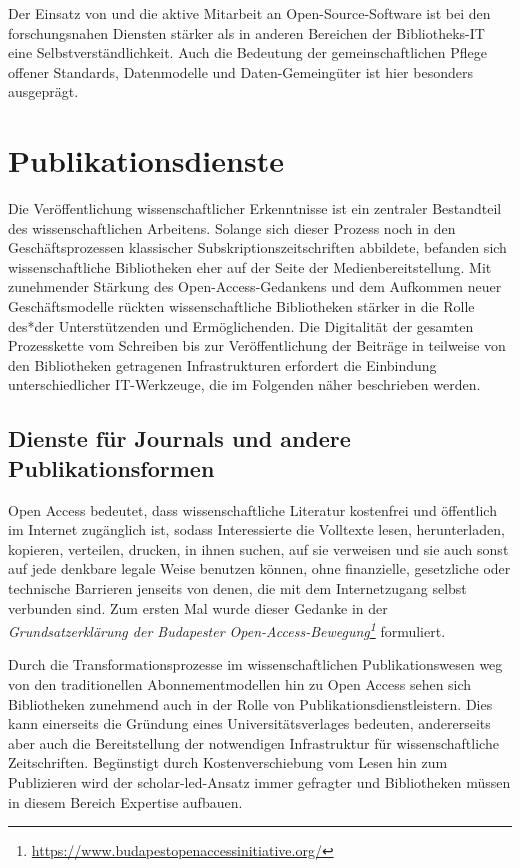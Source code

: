 \documentclass[
  11pt,
  letterpaper,
  DIV=11,
  twoside]{scrreprt}
\DeclareRobustCommand{\href}[2]{#2\footnote{\url{#1}}}
\begin{document}
Der Einsatz von und die aktive Mitarbeit an Open-Source-Software ist bei
den forschungsnahen Diensten stärker als in anderen Bereichen der
Bibliotheks-IT eine Selbstverständlichkeit. Auch die Bedeutung der
gemeinschaftlichen Pflege offener Standards, Datenmodelle und
Daten-Gemeingüter ist hier besonders ausgeprägt.

\section{Publikationsdienste}\label{publikationsdienste}

Die Veröffentlichung wissenschaftlicher Erkenntnisse ist ein zentraler
Bestandteil des wissenschaftlichen Arbeitens. Solange sich dieser
Prozess noch in den Geschäftsprozessen klassischer
Subskriptionszeitschriften abbildete, befanden sich wissenschaftliche
Bibliotheken eher auf der Seite der Medienbereitstellung. Mit
zunehmender Stärkung des Open-Access-Gedankens und dem Aufkommen neuer
Geschäftsmodelle rückten wissenschaftliche Bibliotheken stärker in die
Rolle des*der Unterstützenden und Ermöglichenden. Die Digitalität der
gesamten Prozesskette vom Schreiben bis zur Veröffentlichung der
Beiträge in teilweise von den Bibliotheken getragenen Infrastrukturen
erfordert die Einbindung unterschiedlicher IT-Werkzeuge, die im
Folgenden näher beschrieben werden.

\subsection{Dienste für Journals und andere
Publikationsformen}\label{dienste-fuxfcr-journals-und-andere-publikationsformen}

Open Access bedeutet, dass wissenschaftliche Literatur kostenfrei und
öffentlich im Internet zugänglich ist, sodass Interessierte die
Volltexte lesen, herunterladen, kopieren, verteilen, drucken, in ihnen
suchen, auf sie verweisen und sie auch sonst auf jede denkbare legale
Weise benutzen können, ohne finanzielle, gesetzliche oder technische
Barrieren jenseits von denen, die mit dem Internetzugang selbst
verbunden sind. Zum ersten Mal wurde dieser Gedanke in der
\emph{\href{https://www.budapestopenaccessinitiative.org/}{Grundsatzerklärung
der Budapester Open-Access-Bewegung}} formuliert.

Durch die Transformationsprozesse im wissenschaftlichen
Publikationswesen weg von den traditionellen Abonnementmodellen hin zu
Open Access sehen sich Bibliotheken zunehmend auch in der Rolle von
Publikationsdienstleistern. Dies kann einerseits die Gründung eines
Universitätsverlages bedeuten, andererseits aber auch die Bereitstellung
der notwendigen Infrastruktur für wissenschaftliche Zeitschriften.
Begünstigt durch Kostenverschiebung vom Lesen hin zum Publizieren wird
der scholar-led-Ansatz immer gefragter und Bibliotheken müssen in diesem
Bereich Expertise aufbauen.
\end{document}
